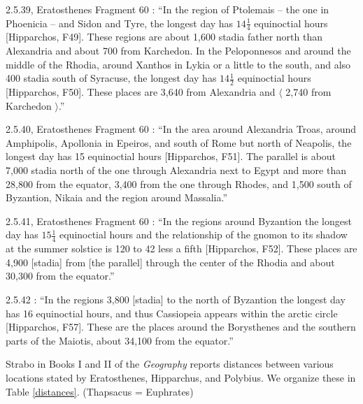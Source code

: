 \documentclass{article}
\theoremstyle{definition}
\begin{document}
2.5.39, Eratosthenes Fragment 60  \cite[pp.~148--149]{strabo}: ``In the region of Ptolemais -- the one in Phoenicia -- and Sidon and Tyre, the longest day has $14 \frac{1}{4}$ equinoctial hours [Hipparchos, F49]. These regions
are about 1,600 stadia father north than Alexandria and about 700 from Karchedon. In the Peloponnesos and around the middle of the Rhodia,
around Xanthos in Lykia or a little to the south, and also 400 stadia south of Syracuse, the longest day has $14 \frac{1}{2}$ equinoctial hours [Hipparchos, F50]. These places are 3,640 from
Alexandria and $\langle$ 2,740 from Karchedon $\rangle$.''

2.5.40, Eratosthenes Fragment 60 \cite[p.~149]{strabo}: ``In the area around Alexandria Troas, around Amphipolis, Apollonia in Epeiros, and south of Rome but north of Neapolis, the longest day has
15 equinoctial hours [Hipparchos, F51]. The parallel is about 7,000 stadia north of the one through Alexandria next to Egypt and more than 28,800 from the equator, 3,400 from the one through Rhodes,
and 1,500 south of Byzantion, Nikaia and the region around Massalia.''

2.5.41, Eratosthenes Fragment 60  \cite[p.~149]{strabo}: ``In the regions around Byzantion the longest day has $15 \frac{1}{4}$ equinoctial hours and the relationship of the gnomon to its shadow at the summer
solstice is 120 to 42 less a fifth [Hipparchos, F52]. These places are 4,900 [stadia] from [the parallel] through the center of the Rhodia and about 30,300 from the equator.''


2.5.42 \cite[p.~149]{strabo}: ``In the regions 3,800 [stadia] to the north of Byzantion the longest day has 16 equinoctial hours, and thus Cassiopeia appears within the arctic
circle [Hipparchos, F57]. These are the places around the Borysthenes and the southern parts of the Maiotis, about 34,100 from the equator.''

Strabo in Books I and II of the {\em Geography} \cite{strabo} reports  distances
between various locations stated by Eratosthenes, Hipparchus, and Polybius. We organize these
in Table \ref{distances}.
(Thapsacus = Euphrates)
\end{document}
